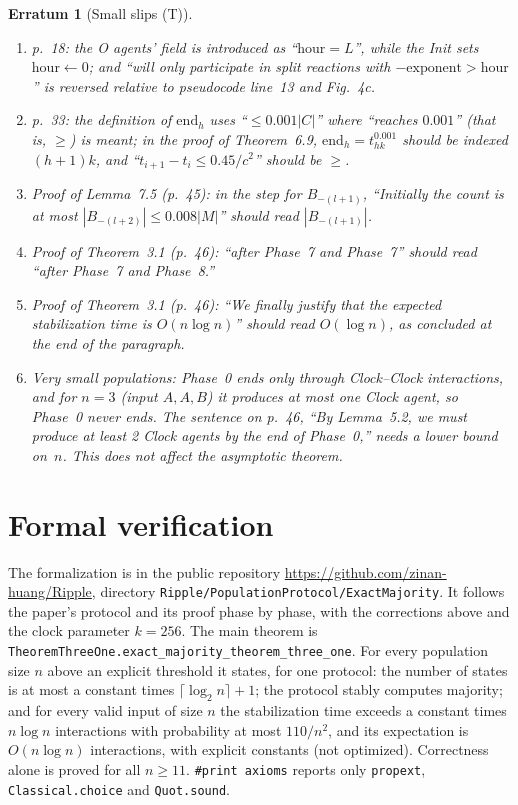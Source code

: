 \documentclass[11pt]{article}
\theoremstyle{erratumstyle}
\newtheorem{erratum}{Erratum}
\begin{document}
\begin{erratum}[Small slips (T)]
\begin{enumerate}
\item p.~18: the O agents' field is introduced as ``$\mathrm{hour}=L$'',
  while the Init sets $\mathrm{hour}\leftarrow0$; and ``will only participate
  in split reactions with $-\mathrm{exponent}>\mathrm{hour}$'' is reversed
  relative to pseudocode line~13 and Fig.~4c.
\item p.~33: the definition of $\mathrm{end}_h$ uses ``$\le0.001|C|$'' where
  ``reaches $0.001$'' (that is, $\ge$) is meant; in the proof of
  Theorem~6.9, $\mathrm{end}_h=t^{0.001}_{hk}$ should be indexed $(h+1)k$,
  and ``$t_{i+1}-t_i\le0.45/c^2$'' should be $\ge$.
\item Proof of Lemma~7.5 (p.~45): in the step for $B_{-(l+1)}$, ``Initially
  the count is at most $|B_{-(l+2)}|\le0.008|M|$'' should read
  $|B_{-(l+1)}|$.
\item Proof of Theorem~3.1 (p.~46): ``after Phase~7 and Phase~7'' should read
  ``after Phase~7 and Phase~8.''
\item Proof of Theorem~3.1 (p.~46): ``We finally justify that the expected
  stabilization time is $O(n\log n)$'' should read $O(\log n)$, as concluded
  at the end of the paragraph.
\item Very small populations: Phase~0 ends only through Clock--Clock
  interactions, and for $n=3$ (input $A,A,B$) it produces at most one Clock
  agent, so Phase~0 never ends. The sentence on p.~46, ``By Lemma~5.2, we
  must produce at least 2 Clock agents by the end of Phase~0,'' needs a lower
  bound on~$n$. This does not affect the asymptotic theorem.
\end{enumerate}
\end{erratum}

\section*{Formal verification}
\sloppy

The formalization is in the public repository
\url{https://github.com/zinan-huang/Ripple}, directory
\texttt{Ripple/PopulationProtocol/ExactMajority}. It follows the paper's
protocol and its proof phase by phase, with the corrections above and the
clock parameter $k=256$. The main theorem is
\texttt{TheoremThreeOne.exact\_majority\_theorem\_three\_one}. For every population
size $n$ above an explicit threshold it states, for one protocol: the number
of states is at most a constant times $\lceil\log_2 n\rceil+1$; the protocol
stably computes majority; and for every valid input of size $n$ the
stabilization time exceeds a constant times $n\log n$ interactions with
probability at most $110/n^2$, and its expectation is $O(n\log n)$
interactions, with explicit constants (not optimized). Correctness alone is
proved for all $n\ge11$. \texttt{\#print axioms} reports only
\texttt{propext}, \texttt{Classical.choice} and \texttt{Quot.sound}.
\end{document}
